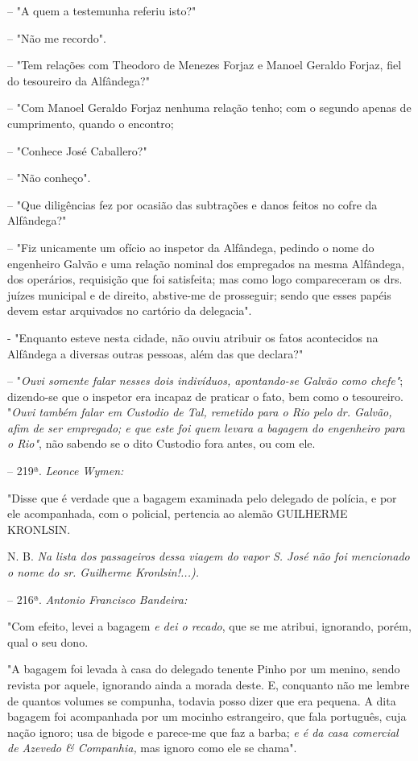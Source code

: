 -- "A quem a testemunha referiu isto?"

-- "Não me recordo".

-- "Tem relações com Theodoro de Menezes Forjaz e Manoel Geraldo Forjaz,
fiel do tesoureiro da Alfândega?"

-- "Com Manoel Geraldo Forjaz nenhuma relação tenho; com o segundo
apenas de cumprimento, quando o encontro;

-- "Conhece José Caballero?"

-- "Não conheço".

-- "Que diligências fez por ocasião das subtrações e danos feitos no
cofre da Alfândega?"

-- "Fiz unicamente um ofício ao inspetor da Alfândega, pedindo o nome do
engenheiro Galvão e uma relação nominal dos empregados na mesma
Alfândega, dos operários, requisição que foi satisfeita; mas como logo
compareceram os drs. juízes municipal e de direito, abstive-me de
prosseguir; sendo que esses papéis devem estar arquivados no cartório da
delegacia".

- "Enquanto esteve nesta cidade, não ouviu atribuir os fatos acontecidos
na Alfândega a diversas outras pessoas, além das que declara?"

-- "\emph{Ouvi somente falar nesses dois indivíduos, apontando-se Galvão
como chefe"}; dizendo-se que o inspetor era incapaz de praticar o fato,
bem como o tesoureiro. "\emph{Ouvi também falar em Custodio de Tal,
remetido para o Rio pelo dr. Galvão, afim de ser empregado; e que este
foi quem levara a bagagem do engenheiro para o Rio"}, não sabendo se o
dito Custodio fora antes, ou com ele.

-- 219ª. \emph{Leonce Wymen:}

"Disse que é verdade que a bagagem examinada pelo delegado de polícia, e
por ele acompanhada, com o policial, pertencia ao alemão GUILHERME
KRONLSIN.

N. B. \emph{Na lista dos passageiros dessa viagem do vapor S. José não
foi mencionado o nome do sr. Guilherme Kronlsin!...).}

-- 216ª. \emph{Antonio Francisco Bandeira:}

"Com efeito, levei a bagagem \emph{e dei o recado}, que se me atribui,
ignorando, porém, qual o seu dono.

"A bagagem foi levada à casa do delegado tenente Pinho por um menino,
sendo revista por aquele, ignorando ainda a morada deste. E, conquanto
não me lembre de quantos volumes se compunha, todavia posso dizer que
era pequena. A dita bagagem foi acompanhada por um mocinho estrangeiro,
que fala português, cuja nação ignoro; usa de bigode e parece-me que faz
a barba; \emph{e é da casa comercial de Azevedo \& Companhia,} mas
ignoro como ele se chama".

